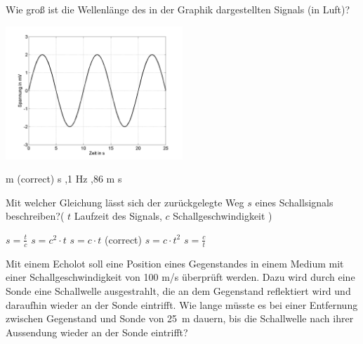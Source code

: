 \documentclass[11pt]{exam}
\begin{document}
\setlength{\voffset}{-0.5in}
\setlength{\headsep}{5pt}

\hspace{2mm}
 \hspace{5mm}
\vspace{4mm}

\begin{questions}

\question Wie groß ist die Wellenlänge des in der Graphik dargestellten Signals (in Luft)? 

\includegraphics[width=0.5\textwidth]{../../../questions/J/images/SchallSinus1.png}

\begin{choices}
	 m (correct)
	 s
	,1 Hz
	,86 m
	 s
\end{choices}

\vspace{3mm}\question Mit welcher Gleichung lässt sich der zurückgelegte Weg \( s \) eines Schallsignals beschreiben?( \( t \) Laufzeit des Signals, \( c \) Schallgeschwindigkeit )

\begin{choices}
	\choice \( s= \frac{t}{c} \)
	\choice \( s=c^2 \cdot t \)
	\choice \( s=c \cdot t \) (correct)
	\choice \( s = c \cdot t^2 \)
	\choice \( s= \frac{c}{t} \)
\end{choices}

\vspace{3mm}\question Mit einem Echolot soll eine Position eines Gegenstandes in einem Medium mit einer Schallgeschwindigkeit von 100 m/s überprüft werden. Dazu wird durch eine Sonde eine Schallwelle ausgestrahlt, die an dem Gegenstand reflektiert wird und daraufhin wieder an der Sonde eintrifft. Wie lange müsste es bei einer Entfernung zwischen Gegenstand und Sonde von 25~m dauern, bis die Schallwelle nach ihrer Aussendung wieder an der Sonde eintrifft?


\end{questions}
\end{document}
